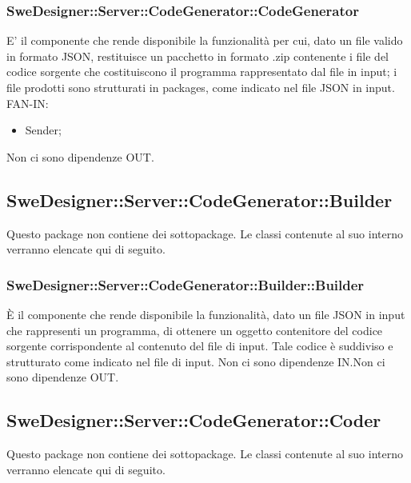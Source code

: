 \documentclass[../PianoDiQualifica.tex]{subfiles}
\begin{document}
		\subsubsection{SweDesigner::Server::CodeGenerator::CodeGenerator}
		E' il componente che rende disponibile la funzionalità per cui, dato un file valido in formato JSON, restituisce un pacchetto in formato .zip contenente i file del codice sorgente che costituiscono il programma rappresentato dal file in input; i file prodotti sono strutturati in packages, come indicato nel file JSON in input.
		FAN-IN:
		\begin{itemize}
			\item Sender;
		\end{itemize}
		Non ci sono dipendenze OUT.\subsection{SweDesigner::Server::CodeGenerator::Builder}
		Questo package non contiene dei sottopackage.
		Le classi contenute al suo interno verranno elencate qui di seguito.
		\subsubsection{SweDesigner::Server::CodeGenerator::Builder::Builder}
		È il componente che rende disponibile la funzionalità, dato un file JSON in input che rappresenti un programma, di ottenere un oggetto contenitore del codice sorgente corrispondente al contenuto del file di input. Tale codice è suddiviso e strutturato come indicato nel file di input.
		Non ci sono dipendenze IN.Non ci sono dipendenze OUT.\subsection{SweDesigner::Server::CodeGenerator::Coder}
		Questo package non contiene dei sottopackage.
		Le classi contenute al suo interno verranno elencate qui di seguito.
\end{document}
